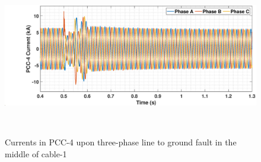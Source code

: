 \begin{figure}[H]
    \includegraphics[height = 7cm,width = \textwidth]{Diagrams/Appendix_C/IABC_WT4_3phaseSC.eps}
    \caption{Currents in PCC-4 upon three-phase line to ground fault in the middle of cable-1}
    \label{IABC_WT4_3phaseSC}
\end{figure}


